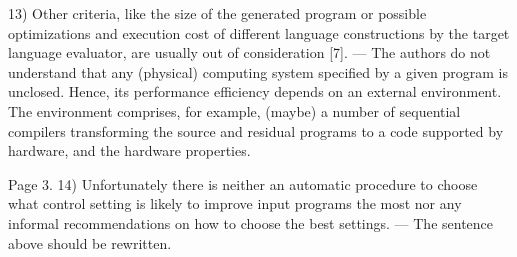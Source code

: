 13) Other criteria, like the size of the generated program or possible optimizations and execution cost of different language constructions by the target language evaluator, are usually out of consideration [7].
 --- The authors do not understand that any (physical) computing system specified by a given program is unclosed. Hence, its performance efficiency depends on an external environment. The environment comprises, for example, (maybe) a number of sequential compilers transforming the source and residual programs to a code supported by hardware, and the hardware properties.

Page 3.
14) Unfortunately there is neither an automatic procedure to choose what control setting is likely to improve input programs the most nor any informal recommendations on how to choose the best settings.
 --- The sentence above should be rewritten.

